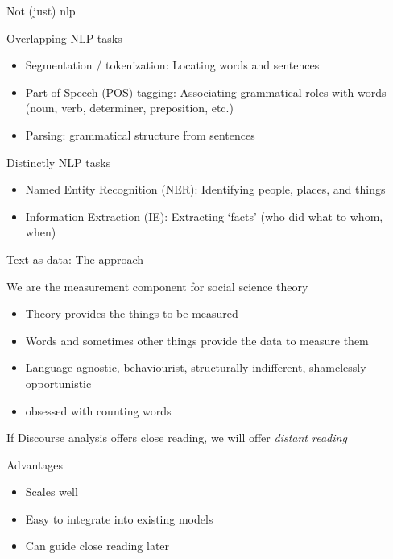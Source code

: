 \documentclass{hertieteaching}\usepackage[]{graphicx}\usepackage[]{color}
\begin{document}
\begin{frame}{Not (just) nlp}

Overlapping NLP tasks
\begin{itemize}
  \item Segmentation / tokenization: Locating words and sentences
  \item Part of Speech (POS) tagging: Associating grammatical
         roles with words (noun, verb, determiner, preposition, etc.)
  \item Parsing: grammatical structure from sentences
\end{itemize}
Distinctly NLP tasks
\begin{itemize}
  \item Named Entity Recognition (NER): Identifying people, places, and things
  \item Information Extraction (IE): Extracting `facts' (who did what to whom, when)
\end{itemize}

%
%

\end{frame}
\begin{frame}{Text as data: The approach}

We are the measurement component for social science theory
\begin{itemize}
  \item Theory provides the things to be measured
  \item Words and sometimes other things provide the data to measure them
  \item Language agnostic, behaviourist, structurally indifferent, shamelessly opportunistic
  \item obsessed with counting words
\end{itemize}

If Discourse analysis offers close reading, we will offer \textit{distant reading}

Advantages
\begin{itemize}
  \item Scales well
  \item Easy to integrate into existing models 
  \item Can guide close reading later
\end{itemize}

\end{frame}
\end{document}
